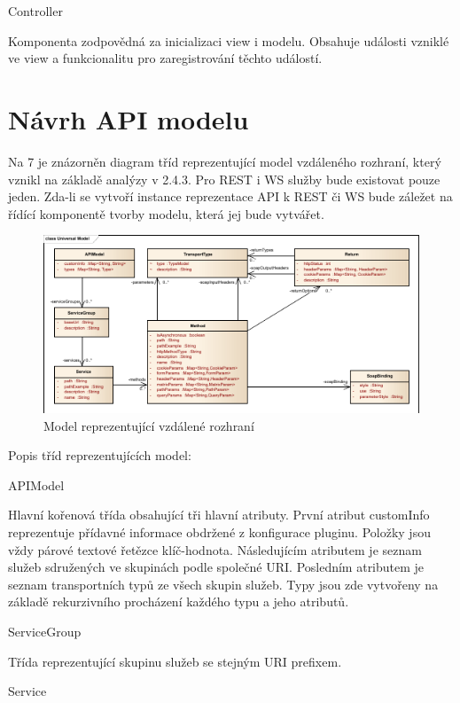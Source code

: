 \documentclass[11pt,twoside,a4paper]{book}
\begin{document}
Controller

Komponenta zodpovědná za inicializaci view i modelu. Obsahuje události vzniklé ve view a
funkcionalitu pro zaregistrování těchto událostí.

\section{Návrh API modelu}

Na 7 je znázorněn diagram tříd reprezentující model vzdáleného rozhraní, který vznikl na
základě analýzy v 2.4.3. Pro REST i WS služby bude existovat pouze jeden. Zda-li se vytvoří
instance reprezentace API k REST či WS bude záležet na řídící komponentě tvorby modelu,
která jej bude vytvářet.

\begin{figure}[h]
\begin{center}
\includegraphics[width=13cm]{images-pdf/Universal-Model.pdf}
\caption{Model reprezentující vzdálené rozhraní}
\label{fig:logo}
\end{center}
\end{figure}

Popis tříd reprezentujících model:

APIModel

Hlavní kořenová třída obsahující tři hlavní atributy. První atribut customInfo reprezentuje
přídavné informace obdržené z konfigurace pluginu. Položky jsou vždy párové textové
řetězce klíč-hodnota. Následujícím atributem je seznam služeb sdružených ve skupinách
podle společné URI. Posledním atributem je seznam transportních typů ze všech skupin
služeb. Typy jsou zde vytvořeny na základě rekurzivního procházení každého typu a jeho
atributů.

ServiceGroup

Třída reprezentující skupinu služeb se stejným URI prefixem.

Service
\end{document}
